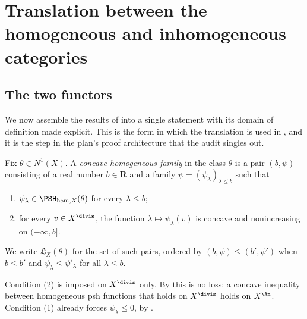 \section{Translation between the homogeneous and inhomogeneous categories}
\label{sec:ch35-translation}

\subsection{The two functors}
\label{sec:ch35-two-functors}

We now assemble the results of
 into a single statement
with its domain of definition made explicit.  This is the form in which the
translation is used in
,
and it is the step in the plan's proof architecture that the audit singles
out.

\begin{definition}
\label{def:ch35-legendre-category}
Fix $\theta\in N^1(X)$.  A \emph{concave homogeneous family} in the class
$\theta$ is a pair $(b,\psi)$ consisting of a real number
$b\in\mathbf R$ and a family
$\psi=(\psi_\lambda)_{\lambda\leq b}$ such that
\begin{enumerate}
\item $\psi_\lambda\in\PSH_{\mathrm{hom},X}(\theta)$ for every
 $\lambda\leq b$;
\item for every $v\in X^{\divis}$, the function
 $\lambda\mapsto\psi_\lambda(v)$ is concave and nonincreasing on
 $(-\infty,b]$.
\end{enumerate}
We write $\mathfrak L_X(\theta)$ for the set of such pairs, ordered by
$(b,\psi)\leq(b',\psi')$ when $b\leq b'$ and
$\psi_\lambda\leq\psi'_\lambda$ for all $\lambda\leq b$.
\end{definition}

Condition (2) is imposed on $X^{\divis}$ only.  By
 this is no loss: a concave
inequality between homogeneous psh functions that holds on
$X^{\divis}$ holds on $X^{\An}$.  Condition (1) already forces
$\psi_\lambda\leq0$, by
.

